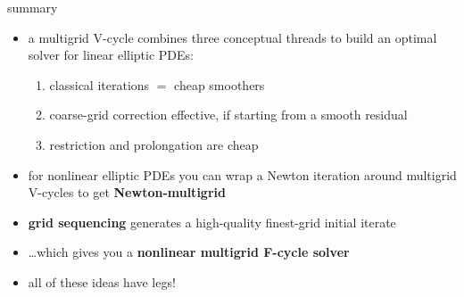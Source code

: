 \documentclass[10pt,
               svgnames,
               hyperref={colorlinks,citecolor=DeepPink4,linkcolor=FireBrick,urlcolor=Maroon},
               usepdftitle=false]{beamer}
\begin{document}
\begin{frame}{summary}
\begin{itemize}
\item a multigrid V-cycle combines three conceptual threads to build an optimal solver for linear elliptic PDEs:
\begin{enumerate}
\item classical iterations $=$ cheap smoothers
\item coarse-grid correction effective, if starting from a smooth residual
\item restriction and prolongation are cheap
\end{enumerate}

\medskip
\item for nonlinear elliptic PDEs you can wrap a Newton iteration around multigrid V-cycles to get \textbf{Newton-multigrid}
\item \textbf{grid sequencing} generates a high-quality finest-grid initial iterate
\item \dots which gives you a \textbf{nonlinear multigrid F-cycle solver}

\medskip
\item all of these ideas have legs!
\end{itemize}
\end{frame}
\end{document}

